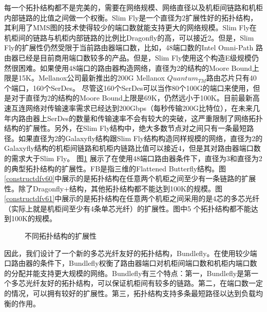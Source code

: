 每一个拓扑结构都不是完美的，需要在网络规模、网络直径以及机柜间链路和机柜内部链路的比值之间做一个权衡。Slim Fly是一个直径为2扩展性好的拓扑结构，其利用了MMS图的技术使得较少的端口数就能支持更大的网络规模。Slim Fly在机柜间的链路与机柜内部链路的比例比Dragonfly的高，可以接近2。但是，Slim Fly的扩展性仍然受限于当前路由器端口数，比如，48端口数的Intel Omni-Path 路由器已经是目前商用端口数较多的产品。但是，Slim Fly使用这个构造E级规模仍然很困难。如果使用48端口的路由器构造网络，直径为2的结构的Moore Bound上限是15K。Mellanox公司最新推出的200G Mellanox $Quantum_{TM}$路由芯片只有40个端口，160个SerDes。 尽管这160个SerDes可以当作80个100G的端口来使用，但是对于直径为2的结构的Moore Bound上限是69K，仍然远小于100K。目前最新高速互连网络对传输速率需求已经达到200Gbps（每秒传输200G比特位），在未来几年内路由器上SerDes的数量和传输速率不会有较大的突破，这严重限制了网络拓扑结构的扩展性。另外，在Slim Fly结构中，绝大多数节点对之间只有一条最短路径。如果直径为2的Galaxyfly结构跟Slim Fly结构构造同样规模的网络，直径为2的Galaxyfly结构的机柜间链路和机柜内链路比值可以接近4，但是其对路由器端口数的需求大于Slim Fly。 图\ref{constructdfv6} 展示了在使用48端口路由器条件下，直径为3和直径为2的典型拓扑结构的扩展性。FB是指三维的Flattened Butterfly结构。图\ref{constructdfv60}中展示的是拓扑结构在任意两个机柜之间至少有一条链路的扩展性。除了Dragonfly+结构，其他拓扑结构都不能达到100K的规模。图\ref{constructdfv61}中展示的是拓扑结构在任意两个机柜之间采用的是4芯的多芯光纤（实际上就是机柜间至少有4条单芯光纤）的扩展性。图中5 个拓扑结构都不能达到100K的规模。

\begin{figure}[t]
   \begin{minipage}[t]{\textwidth}
   \centering

  \caption{不同拓扑结构的扩展性}
  \label{constructdfv6}
  \end{minipage}
  \end{figure}

  因此，我们设计了一个新的多芯光纤友好的拓扑结构，Bundlefly。在使用较少端口路由器的条件下，Bundlefly权衡了路由器端口对机柜间端口数和机柜内端口数的分配并能支持更大规模的网络。Bundlefly有三个特点：第一，Bundlefly是第一个多芯光纤友好的拓扑结构，可以保证机柜间有较多的链路。第二，在端口数一定的情况，可以拥有较好的扩展性。第三，拓扑结构支持多条最短路径以达到负载均衡的作用。

